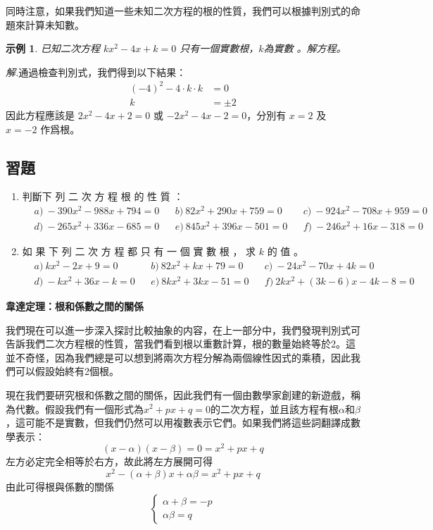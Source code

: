 \documentclass[12pt]{article}
\newtheorem{example}{示例}
\begin{document}
    同時注意，如果我們知道一些未知二次方程的根的性質，我們可以根據判別式的命題來計算未知數。

    \begin{example}
        已知二次方程 $kx^2-4x+k=0$ 只有一個實數根，$k$為實數 。解方程。
    \end{example}

    \textit{ 解.}通過檢查判別式，我們得到以下結果：\begin{align*}
        (-4)^2-4\cdot k\cdot k&=0\\
        k&=\pm 2
    \end{align*}
    \indent \indent 因此方程應該是 $2x^2-4x+2=0$ 或 $-2x^2-4x-2=0$，分別有 $x=2$ 及 $x=-2$ 作爲根。

    \subsection*{習題}
    \begin{enumerate}
        \item 判斷下 列 二 次 方 程 根 的 性 質 ：\begin{align*}
            &a)\ -390x^2-988x+794=0&&b)\ 82x^2+290x+759=0&&c)\ -924x^2-708x+959=0\\
            &d)\ -265x^2+336x-685=0&&e)\ 845x^2+396x-501=0&&f)\ -246x^2+16x-318=0
        \end{align*}
        \item 如 果 下 列 二 次 方 程 都 只 有 一 個 實 數 根 ， 求 $k$ 的 值 。\begin{align*}
            &a)\ kx^2-2x+9=0&&b)\ 82x^2+kx+79=0&&c)\ -24x^2-70x+4k=0\\
            &d)\ -kx^2+36x-k=0&&e)\ 8kx^2+3kx-51=0&&f)\ 2kx^2+(3k-6)x-4k-8=0
        \end{align*}
    \end{enumerate}

    \begin{center}
        \textbf{韋達定理：根和係數之間的關係}
    \end{center}

    我們現在可以進一步深入探討比較抽象的内容，在上一部分中，我們發現判別式可告訴我們二次方程根的性質，當我們看到根以重數計算，根的數量始終等於2。這並不奇怪，因為我們總是可以想到將兩次方程分解為兩個線性因式的乘積，因此我們可以假設始終有2個根。

    現在我們要研究根和係數之間的關係，因此我們有一個由數學家創建的新遊戲，稱為代數。假設我們有一個形式為$x^2+px+q=0$的二次方程，並且該方程有根$\alpha$和$\beta$，這可能不是實數，但我們仍然可以用複數表示它們。如果我們將這些詞翻譯成數學表示： $$(x-\alpha)(x-\beta)=0=x^2+px+q$$ 左方必定完全相等於右方，故此將左方展開可得 $$x^2-(\alpha+\beta)x+\alpha\beta=x^2+px+q$$ 由此可得根與係數的關係 $$\begin{cases}
        \alpha+\beta=-p\\ 
        \alpha\beta=q
    \end{cases}$$
\end{document}
